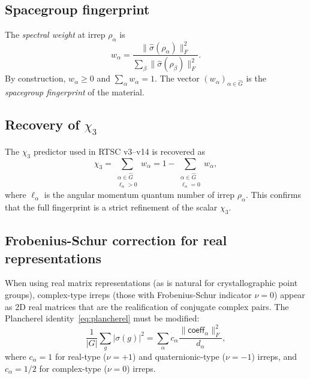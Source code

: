 \documentclass[aps,prb,twocolumn,superscriptaddress]{revtex4-2}
\newcommand{\Ghat}{\widehat{G}}
\newcommand{\frobsq}[1]{\lVert #1 \rVert_F^2}
\newcommand{\sighat}{\hat{\sigma}}
\begin{document}
\subsection{Spacegroup fingerprint}

The \emph{spectral weight} at irrep $\rho_\alpha$ is
\begin{equation}
  w_\alpha = \frac{\frobsq{\sighat(\rho_\alpha)}}
    {\sum_{\beta} \frobsq{\sighat(\rho_\beta)}}.
  \label{eq:spectral-weight}
\end{equation}
By construction, $w_\alpha \ge 0$ and $\sum_\alpha w_\alpha = 1$.
The vector $(w_\alpha)_{\alpha \in \Ghat}$ is the
\emph{spacegroup fingerprint} of the material.

\subsection{Recovery of $\chi_3$}

The $\chi_3$ predictor used in RTSC v3--v14 is recovered as
\begin{equation}
  \chi_3 = \sum_{\substack{\alpha \in \Ghat \\ \ell_\alpha > 0}} w_\alpha
         = 1 - \sum_{\substack{\alpha \in \Ghat \\ \ell_\alpha = 0}} w_\alpha,
  \label{eq:chi3-recovery}
\end{equation}
where $\ell_\alpha$ is the angular momentum quantum number of irrep
$\rho_\alpha$. This confirms that the full fingerprint is a strict
refinement of the scalar $\chi_3$.

\subsection{Frobenius-Schur correction for real representations}

When using real matrix representations (as is natural for
crystallographic point groups), complex-type irreps (those with
Frobenius-Schur indicator $\nu = 0$) appear as 2D real matrices
that are the realification of conjugate complex pairs. The Plancherel
identity~\eqref{eq:plancherel} must be modified:
\begin{equation}
  \frac{1}{|G|} \sum_g |\sigma(g)|^2
  = \sum_\alpha c_\alpha \frac{\frobsq{\mathsf{coeff}_\alpha}}{d_\alpha},
  \label{eq:plancherel-corrected}
\end{equation}
where $c_\alpha = 1$ for real-type ($\nu = +1$) and quaternionic-type
($\nu = -1$) irreps, and $c_\alpha = 1/2$ for complex-type ($\nu = 0$)
irreps.
\end{document}
